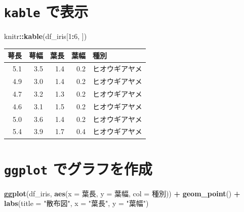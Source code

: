 \documentclass[
  xelatex, ja=standard]{bxjsbook}
\newenvironment{Shaded}{\begin{snugshade}}{\end{snugshade}}
\newcommand{\AttributeTok}[1]{\textcolor[rgb]{0.13,0.29,0.53}{#1}}
\newcommand{\DecValTok}[1]{\textcolor[rgb]{0.00,0.00,0.81}{#1}}
\newcommand{\FunctionTok}[1]{\textcolor[rgb]{0.13,0.29,0.53}{\textbf{#1}}}
\newcommand{\NormalTok}[1]{#1}
\newcommand{\SpecialCharTok}[1]{\textcolor[rgb]{0.81,0.36,0.00}{\textbf{#1}}}
\newcommand{\StringTok}[1]{\textcolor[rgb]{0.31,0.60,0.02}{#1}}
\theoremstyle{definition}
\theoremstyle{definition}
\theoremstyle{definition}
\theoremstyle{definition}
\theoremstyle{remark}
\begin{document}
\hypertarget{kable-ux3067ux8868ux793a}{%
\section{\texorpdfstring{\texttt{kable} で表示}{kable で表示}}\label{kable-ux3067ux8868ux793a}}

\begin{Shaded}
\begin{Highlighting}[]
\NormalTok{knitr}\SpecialCharTok{::}\FunctionTok{kable}\NormalTok{(df\_iris[}\DecValTok{1}\SpecialCharTok{:}\DecValTok{6}\NormalTok{, ])}
\end{Highlighting}
\end{Shaded}

\begin{tabular}{r|r|r|r|l}
\hline
萼長 & 萼幅 & 葉長 & 葉幅 & 種別\\
\hline
5.1 & 3.5 & 1.4 & 0.2 & ヒオウギアヤメ\\
\hline
4.9 & 3.0 & 1.4 & 0.2 & ヒオウギアヤメ\\
\hline
4.7 & 3.2 & 1.3 & 0.2 & ヒオウギアヤメ\\
\hline
4.6 & 3.1 & 1.5 & 0.2 & ヒオウギアヤメ\\
\hline
5.0 & 3.6 & 1.4 & 0.2 & ヒオウギアヤメ\\
\hline
5.4 & 3.9 & 1.7 & 0.4 & ヒオウギアヤメ\\
\hline
\end{tabular}

\hypertarget{ggplot-ux3067ux30b0ux30e9ux30d5ux3092ux4f5cux6210}{%
\section{\texorpdfstring{\texttt{ggplot} でグラフを作成}{ggplot でグラフを作成}}\label{ggplot-ux3067ux30b0ux30e9ux30d5ux3092ux4f5cux6210}}

\begin{Shaded}
\begin{Highlighting}[]
\FunctionTok{ggplot}\NormalTok{(df\_iris, }\FunctionTok{aes}\NormalTok{(}\AttributeTok{x =} \StringTok{\textasciigrave{}}\AttributeTok{葉長}\StringTok{\textasciigrave{}}\NormalTok{, }\AttributeTok{y =} \StringTok{\textasciigrave{}}\AttributeTok{葉幅}\StringTok{\textasciigrave{}}\NormalTok{, }\AttributeTok{col =} \StringTok{\textasciigrave{}}\AttributeTok{種別}\StringTok{\textasciigrave{}}\NormalTok{)) }\SpecialCharTok{+}
  \FunctionTok{geom\_point}\NormalTok{() }\SpecialCharTok{+} \FunctionTok{labs}\NormalTok{(}\AttributeTok{title =} \StringTok{"散布図"}\NormalTok{, }\AttributeTok{x =} \StringTok{"葉長"}\NormalTok{, }\AttributeTok{y =} \StringTok{"葉幅"}\NormalTok{)}
\end{Highlighting}
\end{Shaded}
\end{document}
